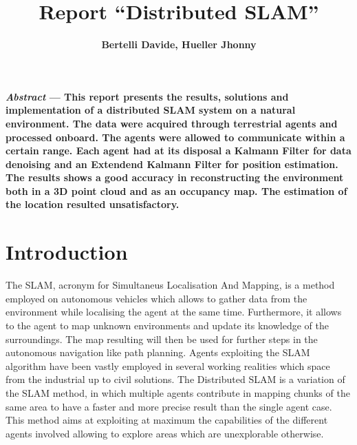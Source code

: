 \documentclass[twocolumn, a4paper]{article}
\begin{document}
\title{
    \Large\textbf{Report ``Distributed SLAM''}
	  }
\author{
		\textbf{Bertelli Davide, Hueller Jhonny} \\
	   }
\date{}
\maketitle

\textbf{
    {\em{\footnotesize{Abstract}}}%
    \small --- This report presents the results,
    solutions and implementation of a distributed SLAM system
    on a natural environment. The data were acquired through
    terrestrial agents and processed onboard. The agents were
    allowed to communicate within a certain range. Each agent
    had at its disposal a Kalmann Filter for data denoising
    and an Extendend Kalmann Filter for position estimation.
    The results shows a good accuracy in reconstructing the
    environment both in a 3D point cloud and as an occupancy map.
    The estimation of the location resulted unsatisfactory.
    }

\section{Introduction}
The SLAM, acronym for Simultaneus Localisation And Mapping, is a method
employed on autonomous vehicles which allows to gather data from the
environment while localising the agent at the same time. Furthermore, it
allows to the agent to map unknown environments and update its knowledge
of the surroundings. The map resulting will then be used for further steps
in the autonomous navigation like path planning.
Agents exploiting the SLAM algorithm have been vastly employed in several
working realities which space from the industrial 
up to civil solutions.
The Distributed SLAM is a variation of the SLAM method, in which multiple
agents contribute in mapping chunks of the same area to have a faster and
more precise result than the single agent case. This method aims at
exploiting at maximum the capabilities of the different agents involved
allowing to explore areas which are unexplorable otherwise.
\end{document}
